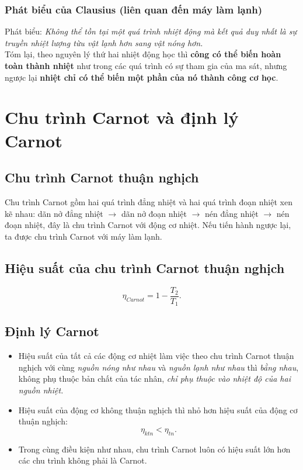 \subsubsection{Phát biểu của Clausius (liên quan đến máy làm lạnh)}
Phát biểu: \textit{Không thể tồn tại một quá trình nhiệt động mà kết quả duy nhất là sự truyền nhiệt lượng từu vật lạnh hơn sang vật nóng hơn.}\\
Tóm lại, theo nguyên lý thứ hai nhiệt động học thì \textbf{công có thể biến hoàn toàn thành nhiệt} như trong các quá trình có sự tham gia của ma sát, nhưng ngược lại \textbf{nhiệt chỉ có thể biến một phần của nó thành công cơ học}.
\section{Chu trình Carnot và định lý Carnot}
\subsection{Chu trình Carnot thuận nghịch}
Chu trình Carnot gồm hai quá trình đẳng nhiệt và hai quá trình đoạn nhiệt xen kẽ nhau: dãn nở đẳng nhiệt $\to$ dãn nở đoạn nhiệt $\to$ nén đẳng nhiệt $\to$ nén đoạn nhiệt, đây là chu trình Carnot với động cơ nhiệt. Nếu tiến hành ngược lại, ta được chu trình Carnot với máy làm lạnh.
\subsection{Hiệu suất của chu trình Carnot thuận nghịch}
$$\eta_{Carnot} = 1 - \frac{T_2}{T_1}.$$
\subsection{Định lý Carnot}
\begin{itemize}
\item Hiệu suất của tất cả các động cơ nhiệt làm việc theo chu trình Carnot thuận nghịch với cùng \textit{nguồn nóng như nhau} và \textit{nguồn lạnh như nhau} thì \textit{bằng nhau}, không phụ thuộc bản chất của tác nhân, \textit{chỉ phụ thuộc vào nhiệt độ của hai nguồn nhiệt.}
\item Hiệu suất của động cơ không thuận nghịch thì nhỏ hơn hiệu suất của động cơ thuận nghịch:
$$\eta_{ktn} < \eta_{tn}.$$
\item Trong cùng điều kiện như nhau, chu trình Carnot luôn có hiệu suất lớn hơn các chu trình không phải là Carnot.
\end{itemize}
